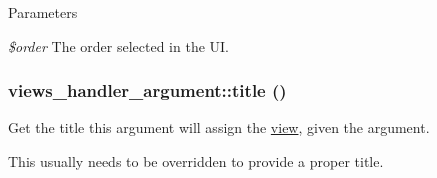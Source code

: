 \begin{DoxyParams}{Parameters}
\item[{\em \$order}]The order selected in the UI. \end{DoxyParams}
\hypertarget{classviews__handler__argument_a76181ac24e7be4a09aaafc1fa5f15ea1}{
\subsubsection[{title}]{\setlength{\rightskip}{0pt plus 5cm}views\_\-handler\_\-argument::title ()}}
\label{classviews__handler__argument_a76181ac24e7be4a09aaafc1fa5f15ea1}
Get the title this argument will assign the \hyperlink{classview}{view}, given the argument.

This usually needs to be overridden to provide a proper title. 

